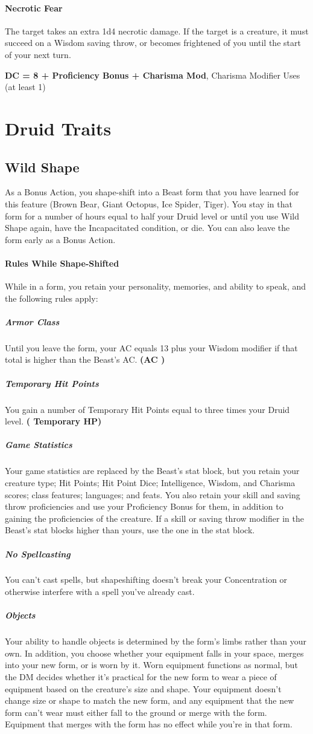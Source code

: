 \documentclass[letterpaper,openany,oneside,twocolumn]{book}
\begin{document}
\paragraph*{Necrotic Fear} The target takes an extra 1d4 necrotic damage. If the target is a creature, it must succeed on a Wisdom saving throw, or becomes frightened of you until the start of your next turn.

\textbf{DC = 8 + Proficiency Bonus + Charisma Mod}, Charisma Modifier Uses (at least 1)

\section*{Druid Traits}
\subsection*{Wild Shape}
As a Bonus Action, you shape-shift into a Beast form that you have learned for this feature (Brown Bear, Giant Octopus, Ice Spider, Tiger). You stay in that form for a number of hours equal to half your Druid level or until you use Wild Shape again, have the Incapacitated condition, or die. You can also leave the form early as a Bonus Action.
\paragraph*{Rules While Shape-Shifted} While in a form, you retain your personality, memories, and ability to speak, and the following rules apply:
\subparagraph*{Armor Class} Until you leave the form, your AC equals 13 plus your Wisdom modifier if that total is higher than the Beast's AC. \textbf{(AC )}
\subparagraph*{Temporary Hit Points} You gain a number of Temporary Hit Points equal to three times your Druid level. \textbf{( Temporary HP)}
\subparagraph*{Game Statistics} Your game statistics are replaced by the Beast's stat block, but you retain your creature type; Hit Points; Hit Point Dice; Intelligence, Wisdom, and Charisma scores; class features; languages; and feats. You also retain your skill and saving throw proficiencies and use your Proficiency Bonus for them, in addition to gaining the proficiencies of the creature. If a skill or saving throw modifier in the Beast's stat blocks higher than yours, use the one in the stat block.
\subparagraph*{No Spellcasting} You can't cast spells, but shapeshifting doesn't break your Concentration or otherwise interfere with a spell you've already cast.
\subparagraph*{Objects} Your ability to handle objects is determined by the form's limbs rather than your own. In addition, you choose whether your equipment falls in your space, merges into your new form, or is worn by it. Worn equipment functions as normal, but the DM decides whether it's practical for the new form to wear a piece of equipment based on the creature's size and shape. Your equipment doesn't change size or shape to match the new form, and any equipment that the new form can't wear must either fall to the ground or merge with the form. Equipment that merges with the form has no effect while you're in that form.
\end{document}
